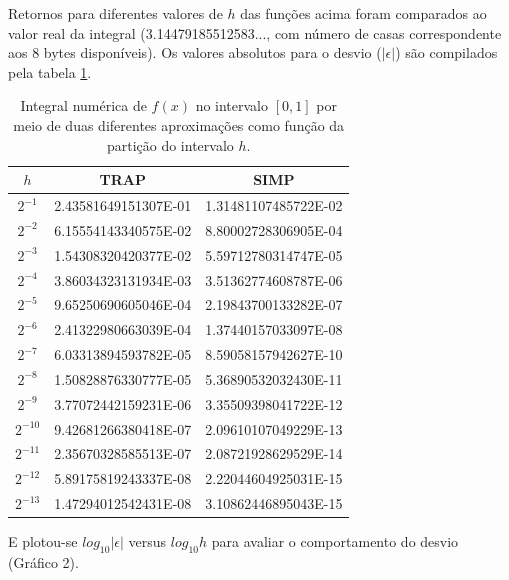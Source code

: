 \documentclass{article}
\begin{document}
Retornos para diferentes valores de $h$ das funções acima foram comparados ao valor real da integral (3.14479185512583..., com número de casas correspondente aos 8 bytes disponíveis). Os valores absolutos para o desvio ($|\epsilon|$) são compilados pela tabela \ref{tab:5}.
\begin{table}[h]
  \centering
  \begin{tabular}{|c|c|c|}
\hline
$h$ & TRAP & SIMP \\
\hline\hline
$2^{-1}$ & 2.43581649151307E-01 & 1.31481107485722E-02 \\
\hline
$2^{-2}$ & 6.15554143340575E-02 & 8.80002728306905E-04 \\
\hline
$2^{-3}$ & 1.54308320420377E-02 & 5.59712780314747E-05 \\
\hline
$2^{-4}$ & 3.86034323131934E-03 & 3.51362774608787E-06 \\
\hline
$2^{-5}$ & 9.65250690605046E-04 & 2.19843700133282E-07 \\
\hline
$2^{-6}$ & 2.41322980663039E-04 & 1.37440157033097E-08 \\
\hline
$2^{-7}$ & 6.03313894593782E-05 & 8.59058157942627E-10 \\
\hline
$2^{-8}$ & 1.50828876330777E-05 & 5.36890532032430E-11 \\
\hline
$2^{-9}$ & 3.77072442159231E-06 & 3.35509398041722E-12 \\
\hline
$2^{-10}$ & 9.42681266380418E-07 & 2.09610107049229E-13 \\
\hline
$2^{-11}$ & 2.35670328585513E-07 & 2.08721928629529E-14 \\
\hline
$2^{-12}$ & 5.89175819243337E-08 & 2.22044604925031E-15 \\
\hline
$2^{-13}$ & 1.47294012542431E-08 & 3.10862446895043E-15\\
\hline
\end{tabular}

  \caption{Integral numérica de $f(x)$ no intervalo $[0, 1]$ por meio de duas diferentes aproximações como função da partição do intervalo $h$.}
  \label{tab:5}
\end{table}

E plotou-se $log_{10}|\epsilon|$ versus $log_{10}h$ para avaliar o comportamento do desvio (Gráfico 2).
\end{document}
